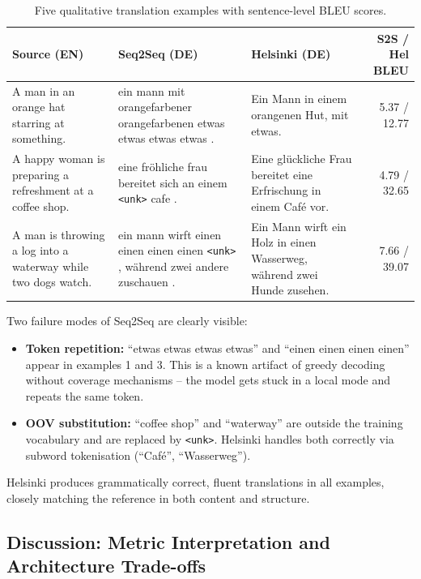\documentclass[11pt,a4paper]{article}
\begin{document}
\begin{table}[H]
\centering
\caption{Five qualitative translation examples with sentence-level BLEU scores.}
\label{tab:q4qual}
\small
\begin{tabular}{p{3.8cm}p{3.8cm}p{3.5cm}r}
\toprule
Source (EN) & Seq2Seq (DE) & Helsinki (DE) & S2S / Hel BLEU \\
\midrule
A man in an orange hat starring at something. &
ein mann mit orangefarbener orangefarbenen etwas etwas etwas etwas . &
Ein Mann in einem orangenen Hut, mit etwas. &
5.37 / 12.77 \\
\midrule
A happy woman is preparing a refreshment at a coffee shop. &
eine fröhliche frau bereitet sich an einem \texttt{<unk>} cafe . &
Eine glückliche Frau bereitet eine Erfrischung in einem Café vor. &
4.79 / 32.65 \\
\midrule
A man is throwing a log into a waterway while two dogs watch. &
ein mann wirft einen einen einen einen \texttt{<unk>} , während zwei andere zuschauen . &
Ein Mann wirft ein Holz in einen Wasserweg, während zwei Hunde zusehen. &
7.66 / 39.07 \\
\bottomrule
\end{tabular}
\end{table}

Two failure modes of Seq2Seq are clearly visible:

\begin{itemize}
    \item \textbf{Token repetition:} ``etwas etwas etwas etwas'' and ``einen einen einen einen'' appear in examples 1 and 3. This is a known artifact of greedy decoding without coverage mechanisms -- the model gets stuck in a local mode and repeats the same token.
    \item \textbf{OOV substitution:} ``coffee shop'' and ``waterway'' are outside the training vocabulary and are replaced by \texttt{<unk>}. Helsinki handles both correctly via subword tokenisation (``Café'', ``Wasserweg'').
\end{itemize}

Helsinki produces grammatically correct, fluent translations in all examples, closely matching the reference in both content and structure.

\subsection{Discussion: Metric Interpretation and Architecture Trade-offs}
\end{document}
